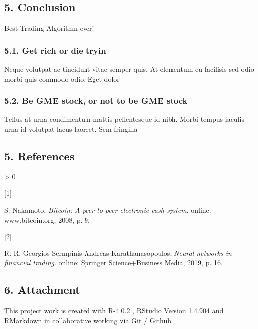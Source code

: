 \documentclass[
]{article}
\newlength{\cslhangindent}
\newlength{\csllabelwidth}
\newenvironment{CSLReferences}[2] %
 {%
  \setlength{\parindent}{0pt}
  \ifodd #1 \everypar{\setlength{\hangindent}{\cslhangindent}}\ignorespaces\fi
  \ifnum #2 > 0
  \setlength{\parskip}{#2\baselineskip}
  \fi
 }%
 {}
\newcommand{\CSLLeftMargin}[1]{\parbox[t]{\csllabelwidth}{#1}}
\newcommand{\CSLRightInline}[1]{\parbox[t]{\linewidth - \csllabelwidth}{#1}\break}
\begin{document}
\newpage

\hypertarget{conclusion}{%
\subsection{5. Conclusion}\label{conclusion}}

Best Trading Algorithm ever!

\hypertarget{get-rich-or-die-tryin}{%
\subsubsection{5.1. Get rich or die tryin}\label{get-rich-or-die-tryin}}

Neque volutpat ac tincidunt vitae semper quis. At elementum eu facilisis
sed odio morbi quis commodo odio. Eget dolor

\hypertarget{be-gme-stock-or-not-to-be-gme-stock}{%
\subsubsection{5.2. Be GME stock, or not to be GME
stock}\label{be-gme-stock-or-not-to-be-gme-stock}}

Tellus at urna condimentum mattis pellentesque id nibh. Morbi tempus
iaculis urna id volutpat lacus laoreet. Sem fringilla

\newpage

\hypertarget{references}{%
\subsection{5. References}\label{references}}

\hypertarget{refs}{}
\begin{CSLReferences}{0}{0}
\leavevmode\hypertarget{ref-bitcoin}{}%
\CSLLeftMargin{{[}1{]} }
\CSLRightInline{S. Nakamoto, \emph{Bitcoin: A peer-to-peer electronic
cash system}. online: www.bitcoin.org, 2008, p. 9.}

\leavevmode\hypertarget{ref-nnfin}{}%
\CSLLeftMargin{{[}2{]} }
\CSLRightInline{R. R. Georgios Sermpinis Andreas Karathanasopoulos,
\emph{Neural networks in financial trading}. online: Springer
Science+Business Media, 2019, p. 16.}

\end{CSLReferences}

\newpage

\hypertarget{attachment}{%
\subsection{6. Attachment}\label{attachment}}

This project work is created with R-4.0.2 , RStudio Version 1.4.904 and
RMarkdown in collaborative working via Git / Github
\end{document}

